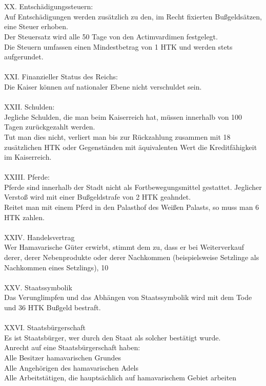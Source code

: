 \documentclass{article}
\begin{document}
\\\\
XX. Entschädigungssteuern:\\Auf Entschädigungen werden zusätzlich zu den, im Recht fixierten Bußgeldsätzen, eine Steuer erhoben. \\Der Steuersatz wird alle 50 Tage von den Actimvardimen festgelegt.\\Die Steuern umfassen einen Mindestbetrag von 1 HTK und werden stets aufgerundet.
\\\\
XXI. Finanzieller Status des Reichs:\\Die Kaiser können auf nationaler Ebene nicht verschuldet sein.
\\\\
XXII. Schulden:\\Jegliche Schulden, die man beim Kaiserreich hat, müssen innerhalb von 100 Tagen zurückgezahlt werden.\\Tut man dies nicht, verliert man bis zur Rückzahlung zusammen mit 18 zusätzlichen HTK oder Gegenständen mit äquivalenten Wert die Kreditfähigkeit im Kaiserreich.
\\\\
XXIII. Pferde:\\Pferde sind innerhalb der Stadt nicht als Fortbewegungsmittel gestattet. Jeglicher Verstoß wird mit einer Bußgeldstrafe von 2 HTK geahndet.\\Reitet man mit einem Pferd in den Palasthof des Weißen Palasts, so muss man 6 HTK zahlen.
\\\\
XXIV. Handelsvertrag\\Wer Hamavarische Güter erwirbt, stimmt dem zu, dass er bei Weiterverkauf derer, derer Nebenprodukte oder derer Nachkommen (beispielsweise Setzlinge als Nachkommen eines Setzlings), 10%
\\\\
XXV. Staatssymbolik\\Das Verunglimpfen und das Abhängen von Staatssymbolik wird mit dem Tode und 36 HTK Bußgeld bestraft.
\\\\
XXVI. Staatsbürgerschaft\\Es ist Staatsbürger, wer durch den Staat als solcher bestätigt wurde.\\Anrecht auf eine Staatsbürgerschaft haben:\\Alle Besitzer hamavarischen Grundes\\Alle Angehörigen des hamavarischen Adels\\Alle Arbeitstätigen, die hauptsächlich auf hamavarischem Gebiet arbeiten
\end{document}
